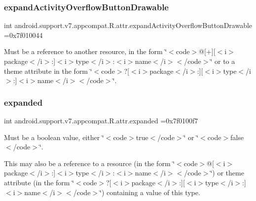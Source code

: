 \subsubsection{\texorpdfstring{expand\+Activity\+Overflow\+Button\+Drawable}{expandActivityOverflowButtonDrawable}}
{\footnotesize\ttfamily int android.\+support.\+v7.\+appcompat.\+R.\+attr.\+expand\+Activity\+Overflow\+Button\+Drawable =0x7f010044\hspace{0.3cm}{\ttfamily [static]}}

Must be a reference to another resource, in the form \char`\"{}$<$code$>$@\mbox{[}+\mbox{]}\mbox{[}$<$i$>$package$<$/i$>$\+:\mbox{]}$<$i$>$type$<$/i$>$\+:$<$i$>$name$<$/i$>$$<$/code$>$\char`\"{} or to a theme attribute in the form \char`\"{}$<$code$>$?\mbox{[}$<$i$>$package$<$/i$>$\+:\mbox{]}\mbox{[}$<$i$>$type$<$/i$>$\+:\mbox{]}$<$i$>$name$<$/i$>$$<$/code$>$\char`\"{}. \mbox{\label{classandroid_1_1support_1_1v7_1_1appcompat_1_1R_1_1attr_a7837ae33f7b43370d81f841bd1cb2f95}} 
\subsubsection{\texorpdfstring{expanded}{expanded}}
{\footnotesize\ttfamily int android.\+support.\+v7.\+appcompat.\+R.\+attr.\+expanded =0x7f0100f7\hspace{0.3cm}{\ttfamily [static]}}

Must be a boolean value, either \char`\"{}$<$code$>$true$<$/code$>$\char`\"{} or \char`\"{}$<$code$>$false$<$/code$>$\char`\"{}. 

This may also be a reference to a resource (in the form \char`\"{}$<$code$>$@\mbox{[}$<$i$>$package$<$/i$>$\+:\mbox{]}$<$i$>$type$<$/i$>$\+:$<$i$>$name$<$/i$>$$<$/code$>$\char`\"{}) or theme attribute (in the form \char`\"{}$<$code$>$?\mbox{[}$<$i$>$package$<$/i$>$\+:\mbox{]}\mbox{[}$<$i$>$type$<$/i$>$\+:\mbox{]}$<$i$>$name$<$/i$>$$<$/code$>$\char`\"{}) containing a value of this type. \mbox{\label{classandroid_1_1support_1_1v7_1_1appcompat_1_1R_1_1attr_a08627166561727866e3653cd31edcaed}} 
